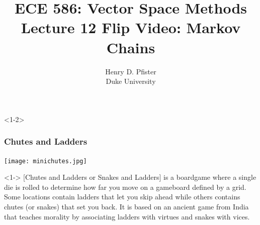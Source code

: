 \documentclass[10pt,english,aspectratio=169]{beamer}
\begin{document}
\title{ECE 586: Vector Space Methods \\ Lecture 12 Flip Video: Markov Chains}
\author{Henry D. Pfister \\ Duke University}
\date{}


\begin{frame}[plain]
	\titlepage
	
\end{frame}

\addtocounter{framenumber}{-1}


\begin{frame}<1-2> \frametitle{Chutes and Ladders}

\vspace{-3mm}

\begin{center}
\texttt{[image: minichutes.jpg]}
\end{center}
\vspace{-4mm}

\begin{example}<1-> [Chutes and Ladders or Snakes and Ladders]
 is a boardgame where a single die is rolled to determine how far you move on a gameboard defined by a grid. Some locations contain ladders that let you skip ahead while others contains chutes (or snakes) that set you back. It is based on an ancient game from India that teaches morality by associating ladders with virtues and snakes with vices.
\end{example}


\vspace{-1mm}


\end{frame}
\end{document}

